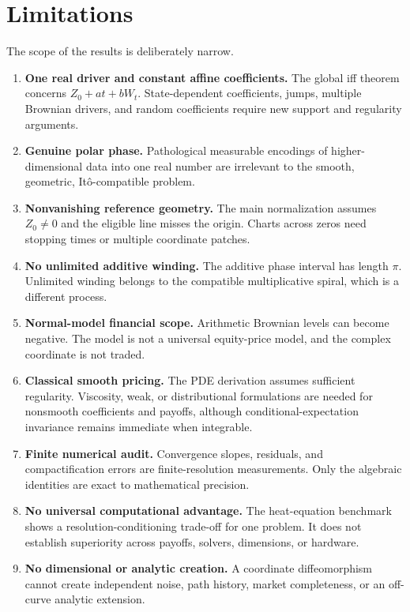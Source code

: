 \documentclass[
  english,
  10pt,
  letterpaper,
  DIV=11,
  numbers=noendperiod]{scrartcl}
\providecommand{\tightlist}{%
  \setlength{\itemsep}{0pt}\setlength{\parskip}{0pt}}
\theoremstyle{definition}
\theoremstyle{plain}
\theoremstyle{plain}
\theoremstyle{remark}
\begin{document}
\section{Limitations}\label{sec-limitations}

The scope of the results is deliberately narrow.

\begin{enumerate}
\def\labelenumi{\arabic{enumi}.}
\tightlist
\item
  \textbf{One real driver and constant affine coefficients.} The global
  iff theorem concerns \(Z_0+at+bW_t\). State-dependent coefficients,
  jumps, multiple Brownian drivers, and random coefficients require new
  support and regularity arguments.
\item
  \textbf{Genuine polar phase.} Pathological measurable encodings of
  higher-dimensional data into one real number are irrelevant to the
  smooth, geometric, Itô-compatible problem.
\item
  \textbf{Nonvanishing reference geometry.} The main normalization
  assumes \(Z_0\ne0\) and the eligible line misses the origin. Charts
  across zeros need stopping times or multiple coordinate patches.
\item
  \textbf{No unlimited additive winding.} The additive phase interval
  has length \(\pi\). Unlimited winding belongs to the compatible
  multiplicative spiral, which is a different process.
\item
  \textbf{Normal-model financial scope.} Arithmetic Brownian levels can
  become negative. The model is not a universal equity-price model, and
  the complex coordinate is not traded.
\item
  \textbf{Classical smooth pricing.} The PDE derivation assumes
  sufficient regularity. Viscosity, weak, or distributional formulations
  are needed for nonsmooth coefficients and payoffs, although
  conditional-expectation invariance remains immediate when integrable.
\item
  \textbf{Finite numerical audit.} Convergence slopes, residuals, and
  compactification errors are finite-resolution measurements. Only the
  algebraic identities are exact to mathematical precision.
\item
  \textbf{No universal computational advantage.} The heat-equation
  benchmark shows a resolution-conditioning trade-off for one problem.
  It does not establish superiority across payoffs, solvers, dimensions,
  or hardware.
\item
  \textbf{No dimensional or analytic creation.} A coordinate
  diffeomorphism cannot create independent noise, path history, market
  completeness, or an off-curve analytic extension.
\end{enumerate}
\end{document}
